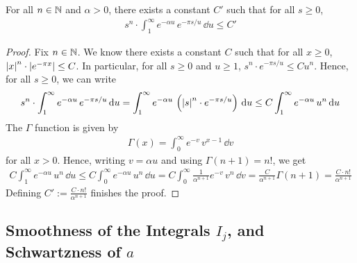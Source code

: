 \begin{lemma}\label{lem:integral-bound}
    For all $n \in \mathbb{N}$ and $\alpha > 0$, there exists a constant $C'$ such that for all $s \geq 0$,
    \begin{align}
        s^n \cdot \int_{1}^{\infty} e^{-\alpha u} \, e^{-\pi s /u} \, \dd u \leq C'
    \end{align}
\end{lemma}
\begin{proof}
    Fix $n \in \mathbb{N}$. We know there exists a constant $C$ such that for all $x \geq 0$, $\left\lvert x \right\rvert^n \cdot \left\lvert e^{-\pi x} \right\rvert \leq C$. In particular, for all $s \geq 0$ and $u \geq 1$, $s^n \cdot e^{-\pi s/u} \leq C u^n$. Hence, for all $s \geq 0$, we can write
    \begin{align}
        s^n \cdot \int_{1}^{\infty} e^{-\alpha u} \, e^{-\pi s /u} \, \mathrm{d}{u}
        = \int_{1}^{\infty} e^{-\alpha u} \, \left(\left\lvert s \right\rvert^n \cdot e^{-\pi s /u}\right) \, \mathrm{d}{u}
        \leq C \int_{1}^{\infty} e^{-\alpha u} \, u^n \, \mathrm{d}{u}
    \end{align}
    The $\Gamma$ function is given by
    \begin{align}
        \Gamma(x) = \int_{0}^{\infty} e^{-v} \, v^{x-1} \, \dd{v}
    \end{align}
    for all $x > 0$. Hence, writing $v = \alpha u$ and using $\Gamma(n+1) = n!$, we get
    \begin{align}
        C \int_{1}^{\infty} e^{-\alpha u} \, u^n \, \dd{u}
        \leq C \int_{0}^{\infty} e^{-\alpha u} \, u^n \, \dd{u}
        = C \int_{0}^{\infty} \frac{1}{\alpha^{n+1}} e^{-v} \, v^n \, \dd{v}
        = \frac{C}{\alpha^{n+1}} \Gamma(n+1)
        = \frac{C \cdot n!}{\alpha^{n+1}}
    \end{align}
    Defining $C' := \frac{C \cdot n!}{\alpha^{n+1}}$ finishes the proof.
\end{proof}

\subsection{Smoothness of the Integrals $I_j$, and Schwartzness of $a$}

